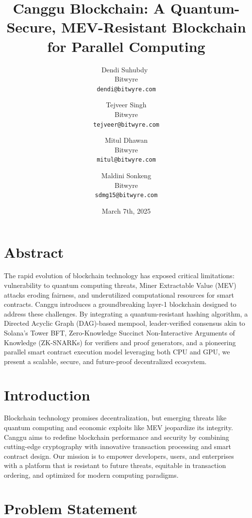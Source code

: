 \documentclass[12pt]{article}
\title{\textbf{Canggu Blockchain}: A Quantum-Secure, MEV-Resistant Blockchain for Parallel Computing}
\author{
    Dendi Suhubdy\ \\
    Bitwyre \\
    \texttt{dendi@bitwyre.com}
    \and
    Tejveer Singh \\
    Bitwyre \\
    \texttt{tejveer@bitwyre.com}
    \and
    Mitul Dhawan\\
    Bitwyre \\
    \texttt{mitul@bitwyre.com}
    \and
    Maldini Sonkeng \\
    Bitwyre \\
    \texttt{sdmg15@bitwyre.com}
}
\date{March 7th, 2025}
\begin{document}
\maketitle

\section*{Abstract}

\begin{justify}
The rapid evolution of blockchain technology has exposed critical limitations: vulnerability to quantum computing threats, Miner Extractable Value (MEV) attacks eroding fairness, and underutilized computational resources for smart contracts. Canggu introduces a groundbreaking layer-1 blockchain designed to address these challenges. By integrating a quantum-resistant hashing algorithm, a Directed Acyclic Graph (DAG)-based mempool, leader-verified consensus akin to Solana’s Tower BFT, Zero-Knowledge Succinct Non-Interactive Arguments of Knowledge (ZK-SNARKs) for verifiers and proof generators, and a pioneering parallel smart contract execution model leveraging both CPU and GPU, we present a scalable, secure, and future-proof decentralized ecosystem.
\end{justify}


\section{Introduction}

\begin{justify}
    Blockchain technology promises decentralization, but emerging threats like quantum computing and economic exploits like MEV jeopardize its integrity. Canggu aims to redefine blockchain performance and security by combining cutting-edge cryptography with innovative transaction processing and smart contract design. Our mission is to empower developers, users, and enterprises with a platform that is resistant to future threats, equitable in transaction ordering, and optimized for modern computing paradigms.

\end{justify}


\section{Problem Statement}
\end{document}
